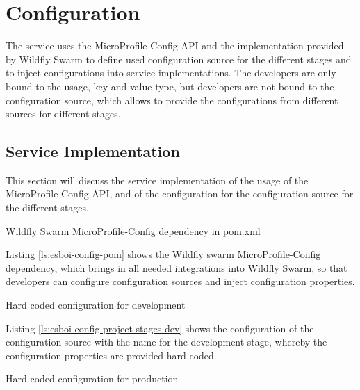 \section{Configuration}
\label{sec:esbi-configuration}
The service uses the MicroProfile Config-API and the implementation provided by Wildfly Swarm to define used configuration source for the different stages and to inject configurations into service implementations. The developers are only bound to the usage, key and value type, but developers are not bound to the configuration source, which allows to provide the configurations from different sources for different stages. 

\subsection{Service Implementation}
\label{sec:esbi-config-service}
This section will discuss the service implementation of the usage of the MicroProfile Config-API, and of the configuration for the configuration source for the different stages.  

\begin{listing}
	\caption{Wildfly Swarm MicroProfile-Config dependency in pom.xml}
	\label{ls:esboi-config-pom}
\end{listing}

Listing \vref{ls:esboi-config-pom} shows the Wildfly swarm MicroProfile-Config dependency, which brings in all needed integrations into Wildfly Swarm, so that developers can configure configuration sources and inject configuration properties.

\begin{listing}
	\caption{Hard coded configuration for development}
	\label{ls:esboi-config-project-stages-dev}
\end{listing}

Listing \vref{ls:esboi-config-project-stages-dev} shows the configuration of the configuration source with the name  for the development stage, whereby the configuration properties are provided hard coded.
\newpage

\begin{listing}
	\caption{Hard coded configuration for production}
	\label{ls:esboi-config-project-stages-prod}
\end{listing}

